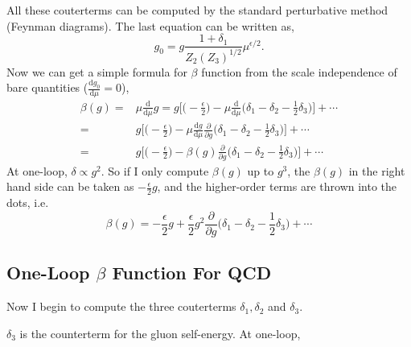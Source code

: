 \documentclass[a4paper,12pt]{article}
\renewcommand{\d}{\mathrm{d}}
\begin{document}
All these couterterms can be computed by the standard perturbative method (Feynman diagrams). The last equation can be written as,
\begin{equation}
    g_0=g\frac{1+\delta_1}{Z_2(Z_3)^{1/2}}\mu^{\epsilon/2}.
\end{equation}
Now we can get a simple formula for $\beta$ function from the scale independence of bare quantities ($\frac{\d g_0}{\d\mu}=0$),
\begin{equation}
    \begin{split}
    \beta(g)=&\mu\frac{\d}{\d \mu}g=g\bigg[\Big(-\frac{\epsilon}{2}\Big)-\mu\frac{\d}{\d \mu}\bigg(\delta_1-\delta_2-\frac{1}{2}\delta_3\bigg)\bigg]+\cdots\\
        =&g\bigg[\Big(-\frac{\epsilon}{2}\Big)-\mu\frac{\d g}{\d \mu}\frac{\partial}{\partial g}\bigg(\delta_1-\delta_2-\frac{1}{2}\delta_3\bigg)\bigg]+\cdots\\
        =&g\bigg[\Big(-\frac{\epsilon}{2}\Big)-\beta(g)\frac{\partial}{\partial g}\bigg(\delta_1-\delta_2-\frac{1}{2}\delta_3\bigg)\bigg]+\cdots
\end{split}
\end{equation}
At one-loop, $\delta\propto g^2$. So if I only compute $\beta(g)$ up to $g^3$, the $\beta(g)$ in the right hand side can be taken as $-\frac{\epsilon}{2}g$, 
and the higher-order terms are thrown into the dots, i.e.
\begin{equation}\label{beta}
    \beta(g)=-\frac{\epsilon}{2}g+\frac{\epsilon}{2}g^2\frac{\partial}{\partial g}\bigg(\delta_1-\delta_2-\frac{1}{2}\delta_3\bigg)+\cdots
\end{equation}

\subsection{One-Loop $\beta$ Function For QCD}
Now I begin to compute the three couterterms $\delta_1,\delta_2$ and $\delta_3$.\par
$\delta_3$ is the counterterm for the gluon self-energy. At one-loop,
\end{document}

